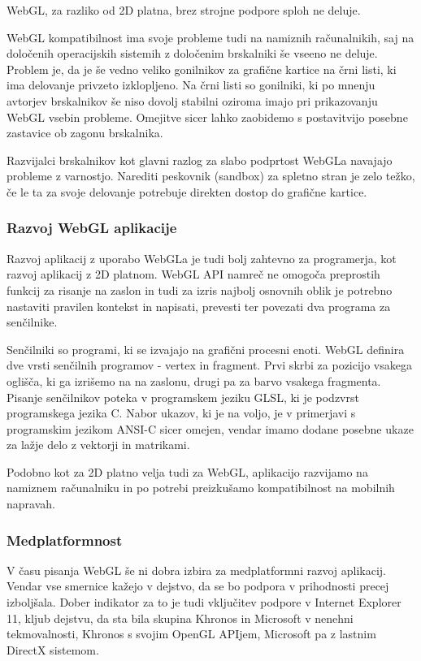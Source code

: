 WebGL, za razliko od 2D platna, brez strojne podpore sploh ne deluje. 

WebGL kompatibilnost ima svoje probleme tudi na namiznih računalnikih, saj na določenih operacijskih sistemih z določenim brskalniki še vseeno ne deluje. Problem je, da je še vedno veliko gonilnikov za grafične kartice na črni listi, ki ima delovanje privzeto izklopljeno. Na črni listi so gonilniki, ki po mnenju avtorjev brskalnikov še niso dovolj stabilni oziroma imajo pri prikazovanju WebGL vsebin probleme. Omejitve sicer lahko zaobidemo s postavitvijo posebne zastavice ob zagonu brskalnika. 

Razvijalci brskalnikov kot glavni razlog za slabo podprtost WebGLa navajajo probleme z varnostjo. Narediti peskovnik (sandbox) za spletno stran je zelo težko, če le ta za svoje delovanje potrebuje direkten dostop do grafične kartice.

\subsubsection{Razvoj WebGL aplikacije}

Razvoj aplikacij z uporabo WebGLa je tudi bolj zahtevno za programerja, kot razvoj aplikacij z 2D platnom. WebGL API namreč ne omogoča preprostih funkcij za risanje na zaslon in tudi za izris najbolj osnovnih oblik je potrebno nastaviti pravilen kontekst in napisati, prevesti ter povezati dva programa za senčilnike. 

Senčilniki so programi, ki se izvajajo na grafični procesni enoti. WebGL definira dve vrsti senčilnih programov - vertex in fragment. Prvi skrbi za pozicijo vsakega oglišča, ki ga izrišemo na na zaslonu, drugi pa za barvo vsakega fragmenta. Pisanje senčilnikov poteka v programskem jeziku GLSL, ki je podzvrst programskega jezika C. Nabor ukazov, ki je na voljo, je v primerjavi s programskim jezikom ANSI-C sicer omejen, vendar imamo dodane posebne ukaze za lažje delo z vektorji in matrikami.

Podobno kot za 2D platno velja tudi za WebGL, aplikacijo razvijamo na namiznem računalniku in po potrebi preizkušamo kompatibilnost na mobilnih napravah.

\subsubsection{Medplatformnost}

V času pisanja WebGL še ni dobra izbira za medplatformni razvoj aplikacij. Vendar vse smernice kažejo v dejstvo, da se bo podpora v prihodnosti precej izboljšala. Dober indikator za to je tudi vključitev podpore v Internet Explorer 11, kljub dejstvu, da sta bila skupina Khronos in Microsoft v nenehni tekmovalnosti, Khronos s svojim OpenGL APIjem, Microsoft pa z lastnim DirectX sistemom.

